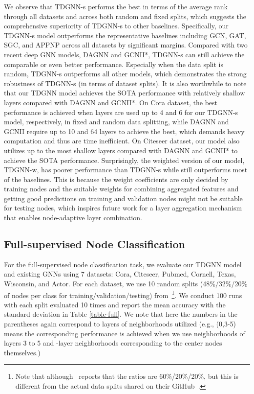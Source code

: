 We observe that TDGNN-s performs the best in terms of the average rank through all datasets and across both random and fixed splits, which suggests the comprehensive superiority of TDGNN-s to other baselines. Specifically, our TDGNN-s model outperforms the representative baselines including GCN, GAT, SGC, and APPNP across all datasets by significant margins. Compared with two recent deep GNN models, DAGNN and GCNII*, TDGNN-s can still achieve the comparable or even better performance. Especially when the data split is random, TDGNN-s outperforms all other models, which demonstrates the strong robustness of TDGNN-s (in terms of dataset splits). It is also worthwhile to note that our TDGNN model achieves the SOTA performance with relatively shallow layers compared with DAGNN and GCNII*. On Cora dataset, the best performance is achieved when layers are used up to 4 and 6 for our TDGNN-s model, respectively, in fixed and random data splitting, while DAGNN and GCNII require up to 10 and 64 layers to achieve the best, which demands heavy computation and thus are time inefficient. On Citeseer dataset, our model also utilizes up to the most shallow layers compared with DAGNN and GCNII* to achieve the SOTA performance. Surprisingly, the weighted version of our model, TDGNN-w, has poorer performance than TDGNN-s while still outperforms most of the baselines. This is because the weight coefficients  are only decided by training nodes and the suitable weights for combining aggregated features  and getting good predictions on training and validation nodes might not be suitable for testing nodes, which inspires future work for a layer aggregation mechanism that enables node-adaptive layer combination.

\vspace{-0.75ex}
\subsection{Full-supervised Node Classification}
For the full-supervised node classification task, we evaluate our TDGNN model and existing GNNs using 7 datasets: Cora, Citeseer, Pubmed, Cornell, Texas, Wisconsin, and Actor. For each dataset, we use 10 random splits (48\%/32\%/20\% of nodes per class for training/validation/testing) from~\cite{geomgcn}\footnote{Note that although~\cite{geomgcn} reports that the ratios are 60\%/20\%/20\%, but this is different from the actual data splits shared on their GitHub~\cite{coin}.}. We conduct 100 runs with each split evaluated 10 times and report the mean accuracy with the standard deviation in Table \ref{table-full}. We note that here the numbers in the parentheses again correspond to layers of neighborhoods utilized (e.g., (0,3-5) means the corresponding performance is achieved when we use neighborhoods of layers 3 to 5 and -layer neighborhoods corresponding to the center nodes themselves.) 


